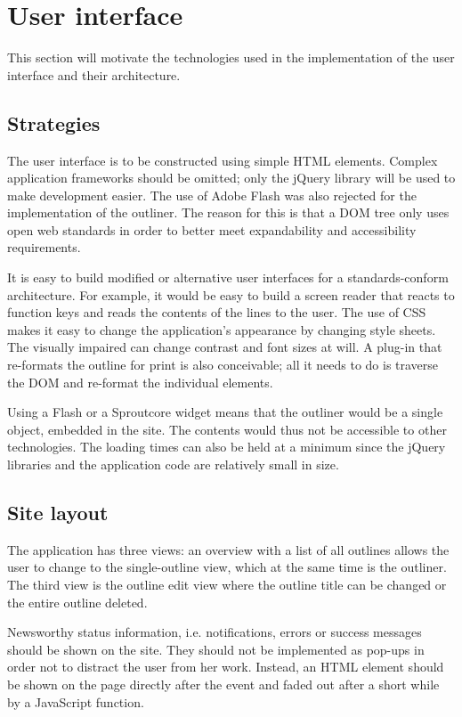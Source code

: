\section{User interface}

This section will motivate the technologies used in the implementation of the user interface and their architecture.


\subsection{Strategies}

The user interface is to be constructed using simple HTML elements. Complex application frameworks should be omitted; only the jQuery library will be used to make development easier. The use of Adobe Flash was also rejected for the implementation of the outliner. The reason for this is that a DOM tree only uses open web standards in order to better meet expandability and accessibility requirements.

It is easy to build modified or alternative user interfaces for a standards-conform architecture. For example, it would be easy to build a screen reader that reacts to function keys and reads the contents of the lines to the user. The use of CSS makes it easy to change the application's appearance by changing style sheets. The visually impaired can change contrast and font sizes at will. A plug-in that re-formats the outline for print is also conceivable; all it needs to do is traverse the DOM and re-format the individual elements.

Using a Flash or a Sproutcore widget \cite{sproutcore:website} means that the outliner would be a single object, embedded in the site. The contents would thus not be accessible to other technologies. The loading times can also be held at a minimum since the jQuery libraries and the application code are relatively small in size.


\subsection{Site layout}

The application has three views: an overview with a list of all outlines allows the user to change to the single-outline view, which at the same time is the outliner. The third view is the outline edit view where the outline title can be changed or the entire outline deleted.

Newsworthy status information, i.e. notifications, errors or success messages should be shown on the site. They should not be implemented as pop-ups in order not to distract the user from her work. Instead, an HTML element should be shown on the page directly after the event and faded out after a short while by a JavaScript function.

